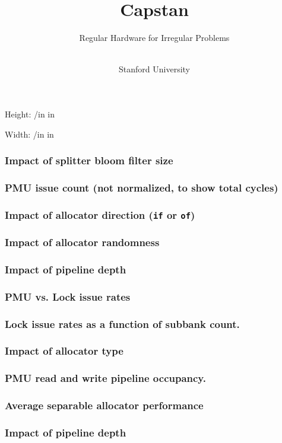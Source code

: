 \documentclass[aspectratio=169]{beamer}
\title{{\Huge \doublebf Capstan}}%
\subtitle{{\Large Regular Hardware for Irregular Problems}}
\author{{\halfbf{Alexander Rucker}}\\
Stanford University}
\makeatletter
\def\convertto#1#2{\strip@pt\dimexpr #2*65536/\number\dimexpr 1#1}
\makeatother
\begin{document}
\maketitle
{}
\begin{frame}
  Height: \convertto{in}{\the\paperheight} in

  Width: \convertto{in}{\the\paperwidth} in
\end{frame}
\fi
\begin{frame}
  \frametitle{Impact of splitter bloom filter size}
  \hskip1.5in
\end{frame}
\begin{frame}
  \frametitle{PMU issue count (not normalized, to show total cycles)}
  \hskip1.5in
\end{frame}
\begin{frame}
  \frametitle{Impact of allocator direction (\texttt{if} or \texttt{of})}
  \hskip1.5in\mbox{}
\end{frame}
\begin{frame}
  \frametitle{Impact of allocator randomness}
  \hskip1.5in
\end{frame}
\begin{frame}
  \frametitle{Impact of pipeline depth}
  \hskip1.5in
\end{frame}
\begin{frame}
  \frametitle{PMU vs. Lock issue rates}
  \hskip1.5in
\end{frame}
\begin{frame}
  \frametitle{Lock issue rates as a function of subbank count.}
  \hskip1.5in
\end{frame}
\begin{frame}
  \frametitle{Impact of allocator type}
  \hskip1.5in
\end{frame}
\begin{frame}
  \frametitle{PMU read and write pipeline occupancy.}
  \hskip1.5in
\end{frame}
\begin{frame}
  \frametitle{Average separable allocator performance}
  \centering
  
\end{frame}
\begin{frame}
  \frametitle{Impact of pipeline depth}
  \centering
  
\end{frame}
\end{document}
